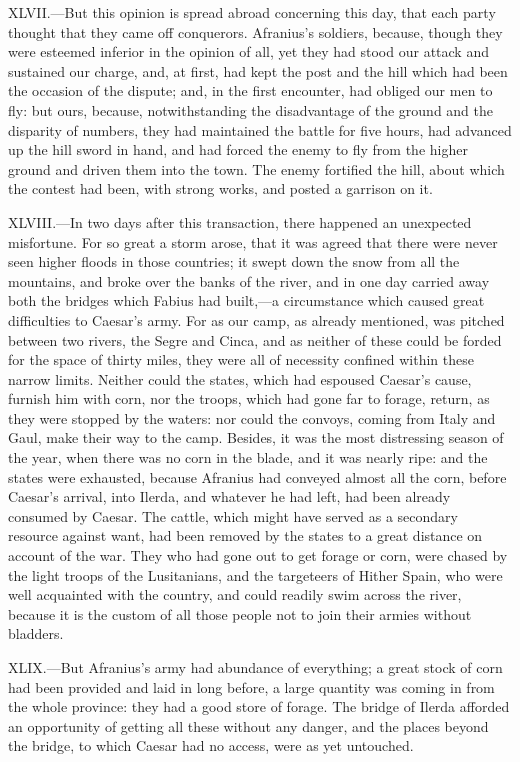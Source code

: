 XLVII.—But this opinion is spread abroad concerning this day, that each
party thought that they came off conquerors. Afranius's soldiers,
because, though they were esteemed inferior in the opinion of all, yet
they had stood our attack and sustained our charge, and, at first, had
kept the post and the hill which had been the occasion of the dispute;
and, in the first encounter, had obliged our men to fly: but ours,
because, notwithstanding the disadvantage of the ground and the
disparity of numbers, they had maintained the battle for five hours, had
advanced up the hill sword in hand, and had forced the enemy to fly from
the higher ground and driven them into the town. The enemy fortified the
hill, about which the contest had been, with strong works, and posted a
garrison on it.

XLVIII.—In two days after this transaction, there happened an
unexpected misfortune. For so great a storm arose, that it was agreed
that there were never seen higher floods in those countries; it swept
down the snow from all the mountains, and broke over the banks of the
river, and in one day carried away both the bridges which Fabius had
built,—a circumstance which caused great difficulties to Caesar's army.
For as our camp, as already mentioned, was pitched between two rivers,
the Segre and Cinca, and as neither of these could be forded for the
space of thirty miles, they were all of necessity confined within these
narrow limits. Neither could the states, which had espoused Caesar's
cause, furnish him with corn, nor the troops, which had gone far to
forage, return, as they were stopped by the waters: nor could the
convoys, coming from Italy and Gaul, make their way to the camp.
Besides, it was the most distressing season of the year, when there was
no corn in the blade, and it was nearly ripe: and the states were
exhausted, because Afranius had conveyed almost all the corn, before
Caesar's arrival, into Ilerda, and whatever he had left, had been
already consumed by Caesar. The cattle, which might have served as a
secondary resource against want, had been removed by the states to a
great distance on account of the war. They who had gone out to get
forage or corn, were chased by the light troops of the Lusitanians, and
the targeteers of Hither Spain, who were well acquainted with the
country, and could readily swim across the river, because it is the
custom of all those people not to join their armies without bladders.

XLIX.—But Afranius's army had abundance of everything; a great stock of
corn had been provided and laid in long before, a large quantity was
coming in from the whole province: they had a good store of forage. The
bridge of Ilerda afforded an opportunity of getting all these without
any danger, and the places beyond the bridge, to which Caesar had no
access, were as yet untouched.

